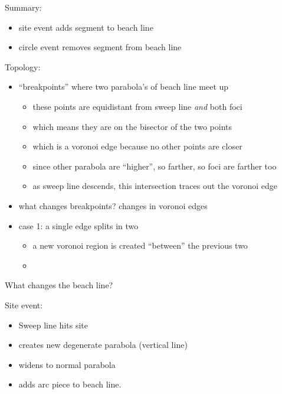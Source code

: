 \documentclass{article}
\begin{document}
Summary:
\begin{itemize}
\item site event adds segment to beach line
\item circle event removes segment from beach line
\end{itemize}

Topology:
\begin{itemize}
\item ``breakpoints'' where two parabola's of beach line meet up
\begin{itemize}
\item these points are equidistant from sweep line \emph{and} both foci
\item which means they are on the bisector of the two points 
\item which is a voronoi edge because no other points are closer
\item since other parabola are ``higher'', so farther, so foci are farther too
\item as sweep line descends, this intersection traces out the voronoi
  edge
\end{itemize}
\item what changes breakpoints?  changes in voronoi edges
\item case 1: a single edge splits in two
\begin{itemize}
\item a new voronoi region is created ``between'' the previous two
\item 
\end{itemize}
\end{itemize}

What changes the beach line?

Site event:
\begin{itemize}
\item Sweep line hits site
\item creates new degenerate parabola (vertical line)
\item widens to normal parabola
\item adds arc piece to beach line.
\end{itemize}
\end{document}
